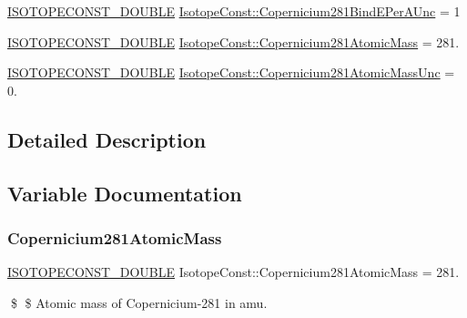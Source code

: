 \begin{DoxyCompactItemize}
\item 
\mbox{\hyperlink{group___isotope_const-_macros_ga8f45a7272ce02c0b4c65c44636ed719a}{I\+S\+O\+T\+O\+P\+E\+C\+O\+N\+S\+T\+\_\+\+D\+O\+U\+B\+LE}} \mbox{\hyperlink{group___isotope_const-_copernicium-_cn281_gac2dc3d052994d09dc305eef9587a7f93}{Isotope\+Const\+::\+Copernicium281\+Bind\+E\+Per\+A\+Unc}} = 1
\item 
\mbox{\hyperlink{group___isotope_const-_macros_ga8f45a7272ce02c0b4c65c44636ed719a}{I\+S\+O\+T\+O\+P\+E\+C\+O\+N\+S\+T\+\_\+\+D\+O\+U\+B\+LE}} \mbox{\hyperlink{group___isotope_const-_copernicium-_cn281_ga0bdac1c24e62afd8b1b21a48225e31ca}{Isotope\+Const\+::\+Copernicium281\+Atomic\+Mass}} = 281.
\item 
\mbox{\hyperlink{group___isotope_const-_macros_ga8f45a7272ce02c0b4c65c44636ed719a}{I\+S\+O\+T\+O\+P\+E\+C\+O\+N\+S\+T\+\_\+\+D\+O\+U\+B\+LE}} \mbox{\hyperlink{group___isotope_const-_copernicium-_cn281_ga6466cad8e62fbaa248054ffbc94661c2}{Isotope\+Const\+::\+Copernicium281\+Atomic\+Mass\+Unc}} = 0.
\end{DoxyCompactItemize}


\subsection{Detailed Description}


\subsection{Variable Documentation}
\mbox{\label{group___isotope_const-_copernicium-_cn281_ga0bdac1c24e62afd8b1b21a48225e31ca}} 
\subsubsection{\texorpdfstring{Copernicium281\+Atomic\+Mass}{Copernicium281AtomicMass}}
{\footnotesize\ttfamily \mbox{\hyperlink{group___isotope_const-_macros_ga8f45a7272ce02c0b4c65c44636ed719a}{I\+S\+O\+T\+O\+P\+E\+C\+O\+N\+S\+T\+\_\+\+D\+O\+U\+B\+LE}} Isotope\+Const\+::\+Copernicium281\+Atomic\+Mass = 281.}

\$ \$ Atomic mass of Copernicium-\/281 in amu. \mbox{\label{group___isotope_const-_copernicium-_cn281_ga6466cad8e62fbaa248054ffbc94661c2}} 
